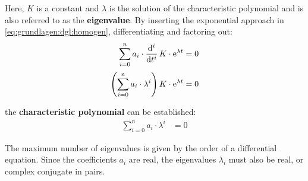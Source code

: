 \begin{frame}
{    %

    Here, $K$ is a constant and $\lambda$ is the solution of the characteristic polynomial 
    and is also referred to as the \textbf{eigenvalue}. 
    By inserting the exponential approach in \ref{eq:grundlagen:dgl:homogen}, differentiating and factoring out:    
    \begin{align}
        \sum_{i=0}^{n} a_i \cdot \dt[i]\, K \cdot \mathrm{e}^{\lambda t} &= 0 \nonumber\\[2pt]
        \left(\sum_{i=0}^{n} a_i \cdot \lambda^i \right) K \cdot \mathrm{e}^{\lambda t} &= 0 \nonumber\\[4pt]
    \end{align}
    the \textbf{characteristic polynomial} can be established:
    \begin{align}
        \sum_{i=0}^{n} a_i \cdot \lambda^i &= 0
    \end{align}

    The maximum number of eigenvalues is given by the order of a differential equation.
    Since the coefficients $a_i$ are real, the eigenvalues $\lambda_i$ must also be real, or complex conjugate in pairs.

}
\end{frame}
